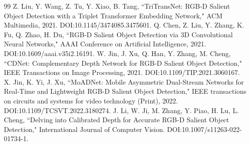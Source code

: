 \documentclass[11pt]{article}
\begin{document}
\begin{thebibliography}{99}
 Z. Liu, Y. Wang, Z. Tu, Y. Xiao, B. Tang, ``TriTransNet: RGB-D Salient Object Detection with a Triplet Transformer Embedding Network," ACM Multimedia, 2021. DOI:10.1145/3474085.3475601.
 Q. Chen, Z. Liu, Y. Zhang, K. Fu, Q. Zhao, H. Du, ``RGB-D Salient Object Detection via 3D Convolutional Neural Networks," AAAI Conference on Artificial Intelligence, 2021. DOI:10.1609/aaai.v35i2.16191.
 W. Jin, J. Xu, Q. Han, Y. Zhang, M. Cheng, ``CDNet: Complementary Depth Network for RGB-D Salient Object Detection," IEEE Transactions on Image Processing, 2021. DOI:10.1109/TIP.2021.3060167.
 X. Jin, K. Yi, J. Xu, ``MoADNet: Mobile Asymmetric Dual-Stream Networks for Real-Time and Lightweight RGB-D Salient Object Detection," IEEE transactions on circuits and systems for video technology (Print), 2022. DOI:10.1109/TCSVT.2022.3180274.
 J. Li, W. Ji, M. Zhang, Y. Piao, H. Lu, L. Cheng, ``Delving into Calibrated Depth for Accurate RGB-D Salient Object Detection," International Journal of Computer Vision. DOI:10.1007/s11263-022-01734-1.
\end{thebibliography}
\end{document}
